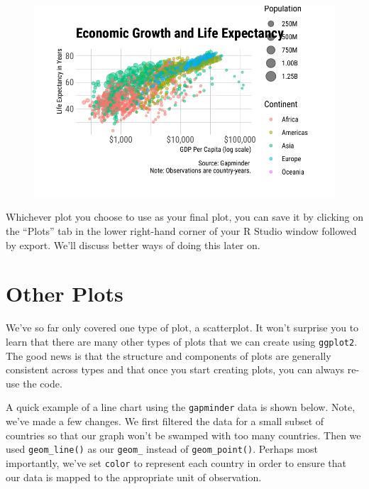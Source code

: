 \documentclass[
  letterpaper,
]{book}
\begin{document}
\begin{figure}[H]

{\centering \includegraphics{visualizing-with-ggplot_files/figure-pdf/unnamed-chunk-27-1.pdf}

}

\end{figure}

Whichever plot you choose to use as your final plot, you can save it by
clicking on the ``Plots'' tab in the lower right-hand corner of your R
Studio window followed by export. We'll discuss better ways of doing
this later on.

\hypertarget{other-plots}{%
\section{Other Plots}\label{other-plots}}

We've so far only covered one type of plot, a scatterplot. It won't
surprise you to learn that there are many other types of plots that we
can create using \texttt{ggplot2}. The good news is that the structure
and components of plots are generally consistent across types and that
once you start creating plots, you can always re-use the code.

A quick example of a line chart using the \texttt{gapminder} data is
shown below. Note, we've made a few changes. We first filtered the data
for a small subset of countries so that our graph won't be swamped with
too many countries. Then we used \texttt{geom\_line()} as our
\texttt{geom\_} instead of \texttt{geom\_point()}. Perhaps most
importantly, we've set \texttt{color} to represent each country in order
to ensure that our data is mapped to the appropriate unit of
observation.
\end{document}
